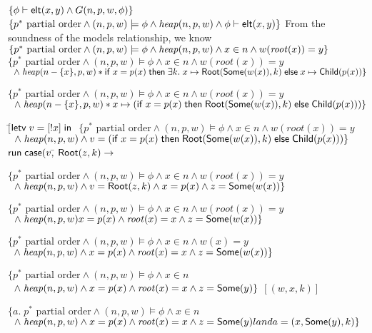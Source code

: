 \begin{specification}
\nextline $\{{\phi} \vdash \mathsf{elt}({x}, {y}) \land G(n, p, w, \phi)\}$
\nextline $\{p^{*} \mbox{ partial order} \land (n, p, w) \models \phi \land
             \mathit{heap}(n, p, w) \land {\phi} \vdash \mathsf{elt}({x}, {y})\}$
\nextline From the soundness of the models relationship, we know 
\nextline $\{p^{*} \mbox{ partial order} \land (n, p, w) \models \phi \land
             \mathit{heap}(n, p, w) \land x \in n \land w(\mathit{root}(x)) = y\}$
\nextline $\{p^{*} \mbox{ partial order} \land (n, p, w) \models \phi \land
             x \in n \land w(\mathit{root}(x)) = y $ 
\nextline $\;\;\land\; \mathit{heap}(n - \{{x}\}, p, w) * \mathsf{if}\;{x = p(x)}\;\mathsf{then}\;{\exists k.\; x \mapsto \mathsf{Root}(\mathsf{Some}(w(x)), k)}\;\mathsf{else}\;{x \mapsto \mathsf{Child}(p(x))}\}$

\nextline $\{p^{*} \mbox{ partial order} \land (n, p, w) \models \phi \land
             x \in n \land w(\mathit{root}(x)) = y $ 
\nextline $\;\;\land\; \mathit{heap}(n - \{{x}\}, p, w) *  x \mapsto (\mathsf{if}\;{x = p(x)}\;\mathsf{then}\;{\mathsf{Root}(\mathsf{Some}(w(x)), k)}\;\mathsf{else}\;{\mathsf{Child}(p(x))})\}$

\nextline $[$\=$\mathsf{letv}\;v = [!x]\;\mathsf{in}\;$ 
\nextline $\{p^{*} \mbox{ partial order} \land (n, p, w) \models \phi \land
             x \in n \land w(\mathit{root}(x)) = y $ 
\nextline $\;\;\land\; \mathit{heap}(n, p, w) \land v = (\mathsf{if}\;{x = p(x)}\;\mathsf{then}\;{\mathsf{Root}(\mathsf{Some}(w(x)), k)}\;\mathsf{else}\;{\mathsf{Child}(p(x))})\}$
\nextline\> $\mathsf{run}\;{}\mathsf{case}(v,$\=
\nextline\> \> $\mathsf{Root}(z, k) \to$

\nextline\> \> $\{p^{*} \mbox{ partial order} \land (n, p, w) \models \phi \land
             x \in n \land w(\mathit{root}(x)) = y $ 
\nextline\> \> $\;\;\land\; \mathit{heap}(n, p, w) \land v = \mathsf{Root}(z, k) \land x = p(x) \land z = \mathsf{Some}(w(x))\}$

\nextline\> \> $\{p^{*} \mbox{ partial order} \land (n, p, w) \models \phi \land
             x \in n \land w(\mathit{root}(x)) = y $ 
\nextline\> \> $\;\;\land\; \mathit{heap}(n, p, w) x = p(x) \land \mathit{root}(x) = x \land z = \mathsf{Some}(w(x))\}$

\nextline\> \> $\{p^{*} \mbox{ partial order} \land (n, p, w) \models \phi \land
             x \in n \land w(x) = y $ 
\nextline\> \> $\;\;\land\; \mathit{heap}(n, p, w) \land x = p(x) \land \mathit{root}(x) = x \land z = \mathsf{Some}(w(x))\}$

\nextline\> \> $\{p^{*} \mbox{ partial order} \land (n, p, w) \models \phi \land
             x \in n $
\nextline\> \> $\;\;\land\; \mathit{heap}(n, p, w) \land x = p(x) \land \mathit{root}(x) = x \land z = \mathsf{Some}(y)\}$
\nextline \> \> $[(w, x, k)]$

\nextline\> \> $\{a.\;p^{*} \mbox{ partial order} \land (n, p, w) \models \phi \land
             x \in n $
\nextline\> \> $\;\;\land\; \mathit{heap}(n, p, w) \land x = p(x) \land \mathit{root}(x) = x \land z = \mathsf{Some}(y) land a = (x, \mathsf{Some}(y), k)\}$


\end{specification}
